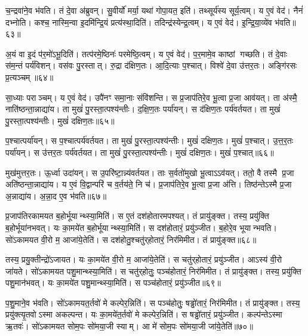 च॒न्द्रवा॑ने॒व भ॑वति।
तं दे॒वा अ॑ब्रुवन्।
सु॒वीर्यो॑ मर्या॒ यथा॑ गोपा॒यत॒ इति॑।
तथ्सूर्य॑स्य सूर्य॒त्वम्।
य ए॒वं वेद॑।
नैनं॑ दभ्नोति।
कश्च॒ नास्मि॒न्वा इ॒दमि॑न्द्रि॒यं प्रत्य॑स्था॒दिति॑।
तदिन्द्र॑स्येन्द्र॒त्वम्।
य ए॒वं वेद॑।
इ॒न्द्रि॒या॒व्ये॑व भ॑वति॥६३॥

अ॒यं वा इ॒दं प॑र॒मो॑\-ऽभू॒दिति॑।
तत्प॑रमे॒ष्ठिनः॑ परमेष्ठि॒त्वम्।
य ए॒वं वेद॑।
प॒र॒मामे॒व काष्ठां गच्छति।
तं दे॒वाः स॑म॒न्तं पर्य॑विशन्।
वस॑वः पु॒रस्तात्।
रु॒द्रा द॑क्षिण॒तः।
आ॒दि॒त्याः प॒श्चात्।
विश्वे॑ दे॒वा उ॑त्तर॒तः।
अङ्गि॑रसः प्र॒त्यञ्चम्॥६४॥

सा॒ध्याः पराञ्चम्।
य ए॒वं वेद॑।
उपै॑नꣳ समा॒नाः संवि॑शन्ति।
स प्र॒जाप॑तिरे॒व भू॒त्वा प्र॒जा आव॑यत्।
ता अ॑स्मै॒ नाति॑ष्ठन्ता॒न्नाद्या॑य।
ता मुखं॑ पु॒रस्ता॒त्पश्य॑न्तीः।
द॒क्षि॒ण॒तः पर्या॑यन्।
स द॑क्षिण॒तः पर्य॑वर्तयत।
ता मुखं॑ पु॒रस्ता॒त्पश्य॑न्तीः।
मुखं॑ दक्षिण॒तः॥६५॥

प॒श्चात्पर्या॑यन्।
स प॒श्चात्पर्य॑वर्तयत।
ता मुखं॑ पु॒रस्ता॒त्पश्य॑न्तीः।
मुखं॑ दक्षिण॒तः।
मुखं॑ प॒श्चात्।
उ॒त्त॒र॒तः पर्या॑यन्।
स उ॑त्तर॒तः पर्य॑वर्तयत।
ता मुखं॑ पु॒रस्ता॒त्पश्य॑न्तीः।
मुखं॑ दक्षिण॒तः।
मुखं॑ प॒श्चात्॥६६॥

मुख॑मुत्तर॒तः।
ऊ॒र्ध्वा उदा॑यन्।
स उ॒परि॑ष्टा॒न्न्य॑वर्तयत।
ताः स॒र्वतो॑मुखो भू॒त्वा\-ऽऽव॑यत्।
ततो॒ वै तस्मै प्र॒जा अति॑ष्ठन्ता॒न्नाद्या॑य।
य ए॒वं वि॒द्वान्परि॑ च व॒र्तय॑ते॒ नि च॑।
प्र॒जाप॑तिरे॒व भू॒त्वा प्र॒जा अ॑त्ति।
तिष्ठ॑न्ते\-ऽस्मै प्र॒जा अ॒न्नाद्या॑य।
अ॒न्ना॒द ए॒व भ॑वति॥६७॥\anuvakamend[आ॒सी॒द्वेद॑ चन्द्रम॒स्त्वं य ए॒वं वेदेन्द्रिया॒व्ये॑व भ॑वति प्र॒त्यञ्चं॒ मुखं॑ दक्षिण॒तो मुखं॑ प॒श्चान्नव॑ च]

प्र॒जाप॑तिरकामयत ब॒होर्भूयान्थ्स्या॒मिति॑।
स ए॒तं दश॑होतारमपश्यत्।
तं प्रायु॑ङ्क्त।
तस्य॒ प्रयु॑क्ति ब॒होर्भूया॑नभवत्।
यः का॒मये॑त ब॒होर्भूयान्थ्स्या॒मिति॑।
स दश॑होतारं॒ प्रयु॑ञ्जीत।
ब॒होरे॒व भूयान्भवति।
सो॑ऽकामयत वी॒रो म॒ आजा॑ये॒तेति॑।
स दश॑होतु॒श्चतु॑र्‌\mbox{}होतारं॒ निर॑मिमीत।
तं प्रायु॑ङ्क्त॥६८॥

तस्य॒ प्रयु॒क्तीन्द्रो॑\-ऽजायत।
यः का॒मये॑त वी॒रो म॒ आजा॑ये॒तेति॑।
स चतु॑र्‌\mbox{}होतारं॒ प्रयु॑ञ्जीत।
आऽस्य॑ वी॒रो जा॑यते।
सो॑ऽकामयत पशु॒मान्थ्स्या॒मिति॑।
स चतु॑र्‌\mbox{}होतुः॒ पञ्च॑होतारं॒ निर॑मिमीत।
तं प्रायु॑ङ्क्त।
तस्य॒ प्रयु॑क्ति पशु॒मान॑भवत्।
यः का॒मये॑त पशु॒मान्थ्स्या॒मिति॑।
स पञ्च॑होतारं॒ प्रयु॑ञ्जीत॥६९॥

प॒शु॒माने॒व भ॑वति।
सो॑ऽकामयत॒र्तवो॑ मे कल्पेर॒न्निति॑।
स पञ्च॑होतुः॒ षड्ढो॑तारं॒ निर॑मिमीत।
तं प्रायु॑ङ्क्त।
तस्य॒ प्रयु॑क्त्यृ॒तवो\-ऽस्मा अकल्पन्त।
यः का॒मये॑त॒र्तवो॑ मे कल्पेर॒न्निति॑।
स षड्ढो॑तारं॒ प्रयु॑ञ्जीत।
कल्प॑न्ते\-ऽस्मा ऋ॒तवः॑।
सो॑ऽकामयत सोम॒पः सो॑मया॒जी स्याम्।
आ मे॑ सोम॒पः सो॑मया॒जी जा॑ये॒तेति॑॥७०॥

